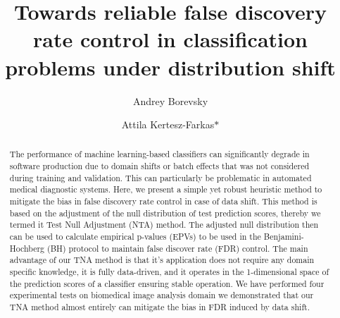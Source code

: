 \documentclass{article}
\author{Andrey Borevsky}
\author{Attila Kertesz-Farkas$\ast$}
\affil{Laboratory on AI for Computational Biology, Faculty of Computer Science, HSE University,  11 Pokrovsky Bvld., Moscow 109028, Russian Federation}
\title{Towards reliable false discovery rate control in classification problems under distribution shift}
\begin{document}
\maketitle

\begin{abstract}
	The performance of machine learning-based classifiers can significantly degrade in software production due to domain shifts or batch effects that was not considered during training and validation. This can particularly be problematic in automated medical diagnostic systems. Here, we present a simple yet robust heuristic method to mitigate the bias in false discovery rate control in case of data shift. This method is based on the adjustment of the null distribution of test prediction scores, thereby we termed it Test Null Adjustment (NTA) method. The adjusted null distribution then can be used to calculate empirical p-values (EPVs) to be used in the Benjamini-Hochberg (BH) protocol to maintain false discover rate (FDR) control. The main advantage of our TNA method is that it's application does not require any domain specific knowledge, it is fully data-driven, and it operates in the 1-dimensional space of the prediction scores of a classifier ensuring stable operation. We have performed four experimental tests on biomedical image analysis domain we demonstrated that our TNA method almost entirely can mitigate the bias in FDR induced by data shift. 
	
	

\end{abstract}
\end{document}

